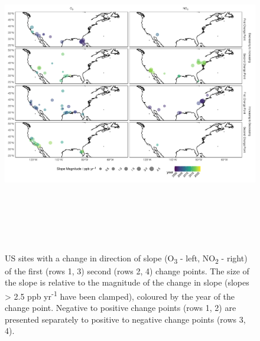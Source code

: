 \documentclass[journal abbreviation, manuscript]{copernicus}
\begin{document}
\begin{figure}
\includegraphics[height=14cm]{figures/f10_us_mag_map.pdf}
\caption{US sites with a change in direction of slope (O\textsubscript{3} - left, NO\textsubscript{2} - right) of the first (rows 1, 3) second (rows 2, 4) change points. The size of the slope is relative to the magnitude of the change in slope (slopes > 2.5 ppb yr\textsuperscript{-1} have been clamped), coloured by the year of the change point. Negative to positive change points (rows 1, 2) are presented separately to positive to negative change points (rows 3, 4).}
\label{fig:us_changepoint_map}
\end{figure}
\end{document}
